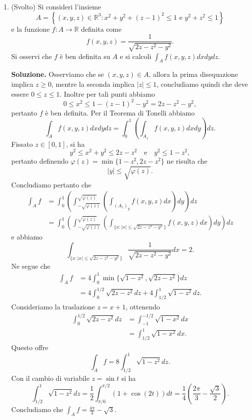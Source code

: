 \begin{enumerate}
	
	\item (Svolto) Si consideri l'insieme
	\[
	A = \left\{(x,y,z) \in \mathbb{R}^3 : x^2 + y^2 + (z - 1)^2 \leq 1 \text{ e } y^2 + z^2 \leq 1\right\}
	\]
	e la funzione $f: A \to \mathbb{R}$ definita come
	\[
	f(x,y,z) = \frac{1}{\sqrt{2z - z^2 - y^2}}.
	\]
	Si osservi che $f$ è ben definita su $A$ e si calcoli $\int_A f(x,y,z) dx dy dz$.
	
	\textbf{Soluzione.}
		Osserviamo che se $(x,y,z) \in A$, allora la prima disequazione implica $z \geq 0$, mentre la seconda implica $|z| \leq 1$, concludiamo quindi che deve essere $0 \leq z \leq 1$. Inoltre per tali punti abbiamo
		\[
		0 \leq x^2 \leq 1 - (z - 1)^2 - y^2 = 2z - z^2 - y^2,
		\]
		pertanto $f$ è ben definita. Per il Teorema di Tonelli abbiamo
		\[
		\int_A f(x,y,z) dx dy dz = \int_0^1 \left(\int_{A_z} f(x,y,z) dx dy\right) dz.
		\]
		Fissato $z \in [0,1]$, si ha
		\[
		y^2 \leq x^2 + y^2 \leq 2z - z^2 \quad \text{e} \quad y^2 \leq 1 - z^2,
		\]
		pertanto definendo $\varphi(z) = \min\{1 - z^2, 2z - z^2\}$ ne risulta che
		\[
		|y| \leq \sqrt{\varphi(z)}.
		\]
		Concludiamo pertanto che
		\[
		\begin{aligned}
			\int_A f &= \int_0^1 \left(\int_{-\sqrt{\varphi(z)}}^{\sqrt{\varphi(z)}} \left(\int_{(A_z)_y} f(x,y,z) dx\right) dy\right) dz \\
			&= \int_0^1 \left(\int_{-\sqrt{\varphi(z)}}^{\sqrt{\varphi(z)}} \left(\int_{\{x : |x| \leq \sqrt{2z - z^2 - y^2}\}} f(x,y,z) dx\right) dy\right) dz
		\end{aligned}
		\]
		e abbiamo
		\[
		\int_{\{x : |x| \leq \sqrt{2z - z^2 - y^2}\}} \frac{1}{\sqrt{2z - z^2 - y^2}} dx = 2.
		\]
		Ne segue che
		\[
		\begin{aligned}
			\int_A f &= 4 \int_0^1 \min\{\sqrt{1 - z^2}, \sqrt{2z - z^2}\} dz \\
			&= 4 \int_0^{1/2} \sqrt{2z - z^2} dz + 4 \int_{1/2}^1 \sqrt{1 - z^2} dz.
		\end{aligned}
		\]
		Consideriamo la traslazione $z = x + 1$, ottenendo
		\[
		\begin{aligned}
			\int_0^{1/2} \sqrt{2z - z^2} dz &= \int_{-1}^{-1/2} \sqrt{1 - x^2} dx \\
			&= \int_{1/2}^1 \sqrt{1 - x^2} dx.
		\end{aligned}
		\]
		Questo offre
		\[
		\int_A f = 8 \int_{1/2}^1 \sqrt{1 - z^2} dz.
		\]
		Con il cambio di variabile $z = \sin t$ si ha
		\[
		\int_{1/2}^1 \sqrt{1 - z^2} dz = \frac{1}{2} \int_{\pi/6}^{\pi/2} (1 + \cos(2t)) dt = \frac{1}{4} \left(\frac{2\pi}{3} - \frac{\sqrt{3}}{2}\right).
		\]
		Concludiamo che $\int_A f = \frac{4\pi}{3} - \sqrt{3}$.
	

\end{enumerate}
